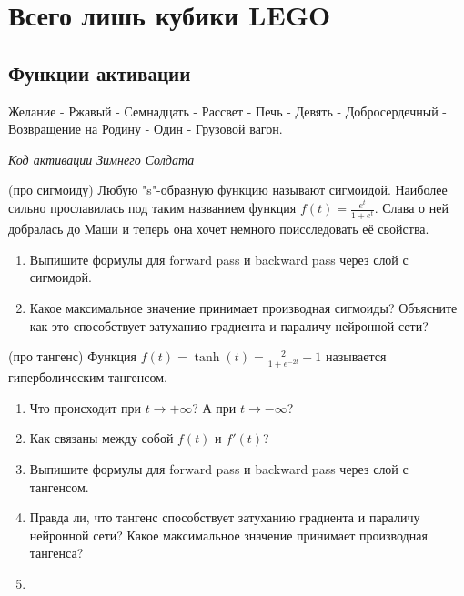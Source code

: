 
\section{Всего лишь кубики LEGO} 

\subsection{Функции активации}

\epigraph{Желание - Ржавый - Семнадцать - Рассвет - Печь - Девять - Добросердечный - Возвращение на Родину - Один - Грузовой вагон.}{\textit{Код активации Зимнего Солдата}}


\begin{problem}{(про сигмоиду)}
Любую "s"-образную функцию называют сигмоидой. Наиболее сильно прославилась под таким названием функция $f(t) = \frac{e^t}{1 + e^t}.$ Слава о ней добралась до Маши и теперь она хочет немного поисследовать её свойства. 

\begin{enumerate}
	\item Выпишите формулы для forward pass и backward pass через слой с сигмоидой. 
	\item Какое максимальное значение принимает производная сигмоиды? Объясните как это способствует затуханию градиента и параличу нейронной сети?  
	\end{enumerate}
\end{problem} 


\begin{problem}{(про тангенс)}
	Функция $f(t) = \tanh(t) = \frac{2}{1 + e^{-2t}} - 1$ называется гиперболическим тангенсом.
	\begin{enumerate}
		\item Что происходит при $t \to +\infty$? А при $t \to -\infty$?
		\item Как связаны между собой $f(t)$ и  $f'(t)$?
		\item Выпишите формулы для forward pass и backward pass через слой с тангенсом. 
		\item Правда ли, что тангенс способствует затуханию градиента и параличу нейронной сети? Какое максимальное значение принимает производная тангенса? 
		\item {}
	\end{enumerate}
\end{problem} 


